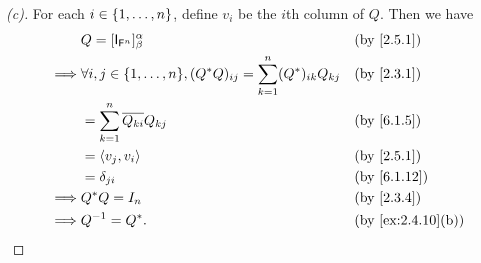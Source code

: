 \begin{proof}[(c)]
	For each \(i \in \left\lbrace1, \dots, n\right\rbrace\), define \(v_i\) be the \(i\)th column of \(Q\).
	Then we have
	\begin{align*}
		         & Q = [\IT[\vs{F}^n]]_{\beta}^{\alpha}                                                   &  & \by{2.5.1}        \\
		\implies & \forall i, j \in \set{1, \dots, n}, (Q^* Q)_{i j} = \sum_{k = 1}^n (Q^*)_{i k} Q_{k j} &  & \by{2.3.1}        \\
		         & = \sum_{k = 1}^n \conj{Q_{k i}} Q_{k j}                                                &  & \by{6.1.5}        \\
		         & = \inn{v_j, v_i}                                                                       &  & \by{2.5.1}        \\
		         & = \delta_{j i}                                                                         &  & \by{6.1.12}       \\
		\implies & Q^* Q = I_n                                                                            &  & \by{2.3.4}        \\
		\implies & Q^{-1} = Q^*.                                                                          &  & \by{ex:2.4.10}[b]
	\end{align*}
\end{proof}

